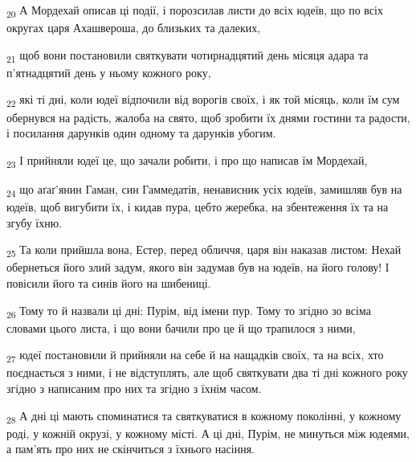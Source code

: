 \begin{tcolorbox}
\textsubscript{20} А Мордехай описав ці події, і порозсилав листи до всіх юдеїв, що по всіх округах царя Ахашвероша, до близьких та далеких,
\end{tcolorbox}
\begin{tcolorbox}
\textsubscript{21} щоб вони постановили святкувати чотирнадцятий день місяця адара та п'ятнадцятий день у ньому кожного року,
\end{tcolorbox}
\begin{tcolorbox}
\textsubscript{22} які ті дні, коли юдеї відпочили від ворогів своїх, і як той місяць, коли їм сум обернувся на радість, жалоба на свято, щоб зробити їх днями гостини та радости, і посилання дарунків один одному та дарунків убогим.
\end{tcolorbox}
\begin{tcolorbox}
\textsubscript{23} І прийняли юдеї це, що зачали робити, і про що написав їм Мордехай,
\end{tcolorbox}
\begin{tcolorbox}
\textsubscript{24} що аґаґ'янин Гаман, син Гаммедатів, ненависник усіх юдеїв, замишляв був на юдеїв, щоб вигубити їх, і кидав пура, цебто жеребка, на збентеження їх та на згубу їхню.
\end{tcolorbox}
\begin{tcolorbox}
\textsubscript{25} Та коли прийшла вона, Естер, перед обличчя, царя він наказав листом: Нехай обернеться його злий задум, якого він задумав був на юдеїв, на його голову! І повісили його та синів його на шибениці.
\end{tcolorbox}
\begin{tcolorbox}
\textsubscript{26} Тому то й назвали ці дні: Пурім, від імени пур. Тому то згідно зо всіма словами цього листа, і що вони бачили про це й що трапилося з ними,
\end{tcolorbox}
\begin{tcolorbox}
\textsubscript{27} юдеї постановили й прийняли на себе й на нащадків своїх, та на всіх, хто поєднається з ними, і не відступлять, але щоб святкувати два ті дні кожного року згідно з написаним про них та згідно з їхнім часом.
\end{tcolorbox}
\begin{tcolorbox}
\textsubscript{28} А дні ці мають споминатися та святкуватися в кожному поколінні, у кожному роді, у кожній окрузі, у кожному місті. А ці дні, Пурім, не минуться між юдеями, а пам'ять про них не скінчиться з їхнього насіння.
\end{tcolorbox}
